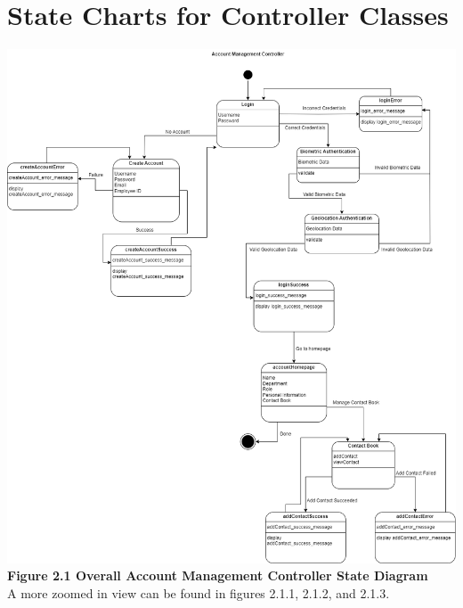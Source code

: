 \documentclass[]{article}
\begin{document}


\section{State Charts for Controller Classes}
\label{sec:state_charts_for_controller_classes}
\begin{center}
\includegraphics[width=\textwidth]{../images/ControllerStateDiagrams/AccountManagementController.drawio.png}
\textbf{Figure 2.1 Overall Account Management Controller State Diagram}
\\A more zoomed in view can be found in figures 2.1.1, 2.1.2, and 2.1.3.

\end{center}
\end{document}
